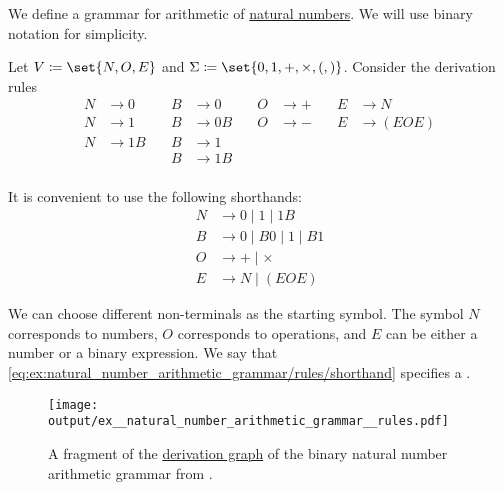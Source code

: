 \begin{example}\label{ex:natural_number_arithmetic_grammar/rules}
  We define a grammar for arithmetic of \hyperref[def:natural_numbers]{natural numbers}. We will use binary notation for simplicity.

  Let \( V \coloneqq \set{ N, O, E } \) and \( \Sigma \coloneqq \set{ 0, 1, +, \times, (, ) } \). Consider the derivation rules
  \begin{equation}\label{eq:ex:natural_number_arithmetic_grammar/rules/simple}
    \begin{aligned}
      N &\to 0   & \quad B &\to 0   & \quad O &\to +      & \quad E &\to N \\
      N &\to 1   & \quad B &\to 0 B & \quad O &\to -      & \quad E &\to (E O E) \\
      N &\to 1 B & \quad B &\to 1   & \quad   &           &         & \\
        &        & \quad B &\to 1 B & \quad   &           &         & \\
    \end{aligned}
  \end{equation}

  It is convenient to use the following shorthands:
  \begin{equation}\label{eq:ex:natural_number_arithmetic_grammar/rules/shorthand}
    \begin{aligned}
      N &\to 0 \mid 1 \mid 1 B \\
      B &\to 0 \mid B 0 \mid 1 \mid B 1 \\
      O &\to + \mid \times \\
      E &\to N \mid (E O E)
    \end{aligned}
  \end{equation}

  We can choose different non-terminals as the starting symbol. The symbol \( N \) corresponds to numbers, \( O \) corresponds to operations, and \( E \) can be either a number or a binary expression. We say that \eqref{eq:ex:natural_number_arithmetic_grammar/rules/shorthand} specifies a .

  \begin{figure}[!ht]
    \centering
    \texttt{[image: output/ex\_\_natural\_number\_arithmetic\_grammar\_\_rules.pdf]}
    \caption{A fragment of the \hyperref[def:formal_grammar/graph]{derivation graph} of the binary natural number arithmetic grammar from .}
    \label{fig:ex:natural_number_arithmetic_grammar/rules}
  \end{figure}
\end{example}

